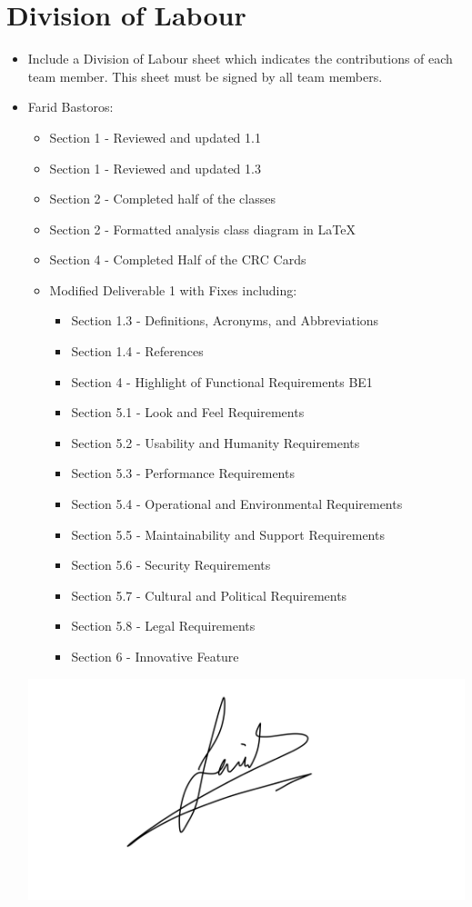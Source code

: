 \documentclass[]{article}
\begin{document}
\section{Division of Labour}
\label{sec:division_of_labour}
\begin{itemize}
	\item Include a Division of Labour sheet which indicates the contributions of each team member. This sheet must be signed by all team members.
	\item Farid Bastoros:
	\begin{itemize} 
		\item Section 1 - Reviewed and updated 1.1
		\item Section 1 - Reviewed and updated 1.3
		\item Section 2 - Completed half of the classes
		\item Section 2 - Formatted analysis class diagram in LaTeX
		\item Section 4 - Completed Half of the CRC Cards
		\item Modified Deliverable 1 with Fixes including: 
		\begin{itemize} 
			\item Section 1.3 - Definitions, Acronyms, and Abbreviations
			\item Section 1.4 - References
			\item Section 4 - Highlight of Functional Requirements BE1
			\item Section 5.1 - Look and Feel Requirements
			\item Section 5.2 - Usability and Humanity Requirements
			\item Section 5.3 - Performance Requirements
			\item Section 5.4 - Operational and Environmental Requirements
			\item Section 5.5 - Maintainability and Support Requirements
			\item Section 5.6 - Security Requirements
			\item Section 5.7 - Cultural and Political Requirements
			\item Section 5.8 - Legal Requirements
			\item Section 6 - Innovative Feature
		\end{itemize}
	\end{itemize}
	\includegraphics[scale=0.09]{Farid Bastoros - Signature.jpeg}\\ 

\end{itemize}
\end{document}
